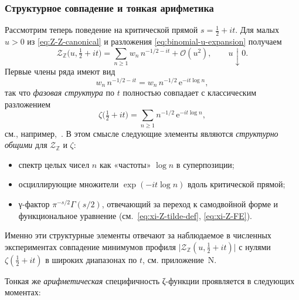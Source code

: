 \documentclass{article}
\numberwithin{equation}{section}
\theoremstyle{plain}
\theoremstyle{definition}
\theoremstyle{remark}
\begin{document}
\subsubsection{Структурное совпадение и тонкая арифметика}
\label{subsubsec:structure-vs-arithmetic}

\noindent
Рассмотрим теперь поведение на критической прямой
$s=\tfrac12+it$. Для малых $u>0$ из
\eqref{eq:Z-Z-canonical} и разложения
\eqref{eq:binomial-u-expansion} получаем
\begin{equation}
\label{eq:Z-Z-critical-line}
\mathcal Z_{\mathbb Z}\big(u,\tfrac12+it\big)
=
\sum_{n\ge 1}
w_n\,n^{-1/2-it}
+
\mathcal O(u^2),
\qquad
u\downarrow 0.
\end{equation}
Первые члены ряда имеют вид
\begin{equation}
\label{eq:phase-structure}
w_n\,n^{-1/2-it}
=
w_n\,n^{-1/2}\,\mathrm e^{-it\log n},
\end{equation}
так что \emph{фазовая структура} по $t$ полностью совпадает с
классическим разложением
\begin{equation}
\label{eq:zeta-on-critical}
\zeta\big(\tfrac12+it\big)
=
\sum_{n\ge 1}n^{-1/2}\,\mathrm e^{-it\log n},
\end{equation}
см., например,~\cite{Titchmarsh1986,Conrey2003}. В этом смысле
следующие элементы являются \emph{структурно общими} для
$\mathcal Z_{\mathbb Z}$ и $\zeta$:

\begin{itemize}
  \item
  спектр целых чисел $n$ как «частоты» $\log n$ в суперпозиции;
  \item
  осциллирующие множители $\exp(-it\log n)$
  вдоль критической прямой;
  \item
  γ-фактор $\pi^{-s/2}\Gamma(s/2)$, отвечающий за переход
  к самодвойной форме и функциональное уравнение
  (см.~\eqref{eq:xi-Z-tilde-def}, \eqref{eq:xi-Z-FE}).
\end{itemize}

Именно эти структурные элементы отвечают за наблюдаемое в численных
экспериментах совпадение минимумов профиля
$\big|\mathcal Z_{\mathbb Z}(u,\tfrac12+it)\big|$ с нулями
$\zeta(\tfrac12+it)$ в широких диапазонах по $t$, см. приложение~N.

\medskip
\noindent
Тонкая же \emph{арифметическая} специфичность ζ-функции проявляется в следующих моментах:
\end{document}
